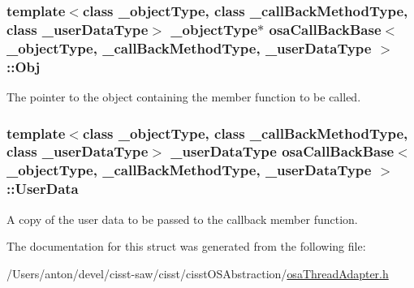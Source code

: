 \subsubsection[{Obj}]{\setlength{\rightskip}{0pt plus 5cm}template$<$class \+\_\+object\+Type, class \+\_\+call\+Back\+Method\+Type, class \+\_\+user\+Data\+Type$>$ \+\_\+object\+Type$\ast$ {\bf osa\+Call\+Back\+Base}$<$ \+\_\+object\+Type, \+\_\+call\+Back\+Method\+Type, \+\_\+user\+Data\+Type $>$\+::Obj}\label{structosa_call_back_base_a3ff953518bf08a840f22a4ff7e5b7c28}
The pointer to the object containing the member function to be called. \hypertarget{structosa_call_back_base_a1178c4cd366dc6de8a939accf7099974}{}
\subsubsection[{User\+Data}]{\setlength{\rightskip}{0pt plus 5cm}template$<$class \+\_\+object\+Type, class \+\_\+call\+Back\+Method\+Type, class \+\_\+user\+Data\+Type$>$ \+\_\+user\+Data\+Type {\bf osa\+Call\+Back\+Base}$<$ \+\_\+object\+Type, \+\_\+call\+Back\+Method\+Type, \+\_\+user\+Data\+Type $>$\+::User\+Data}\label{structosa_call_back_base_a1178c4cd366dc6de8a939accf7099974}
A copy of the user data to be passed to the callback member function. 

The documentation for this struct was generated from the following file\+:\begin{DoxyCompactItemize}
\item 
/\+Users/anton/devel/cisst-\/saw/cisst/cisst\+O\+S\+Abstraction/\hyperlink{osa_thread_adapter_8h}{osa\+Thread\+Adapter.\+h}\end{DoxyCompactItemize}
